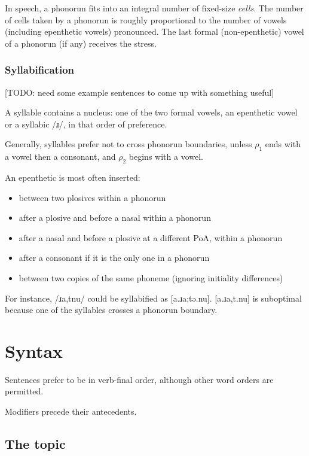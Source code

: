 \documentclass{book}
\begin{document}
In speech, a phonorun fits into an integral number of fixed-size \emph{cells}. The number of cells taken by a phonorun is roughly proportional to the number of vowels (including epenthetic vowels) pronounced. The last formal (non-epenthetic) vowel of a phonorun (if any) receives the stress.

\subsection{Syllabification}

{}[TODO: need some example sentences to come up with something useful]

A syllable contains a nucleus: one of the two formal vowels, an epenthetic vowel or a syllabic /ɹ/, in that order of preference.

Generally, syllables prefer not to cross phonorun boundaries, unless  $\rho_1$ ends with a vowel then a consonant, and $\rho_2$ begins with a vowel.

An epenthetic is most often inserted:

\begin{itemize}
  \item between two plosives within a phonorun
  \item after a plosive and before a nasal within a phonorun
  \item after a nasal and before a plosive at a different PoA, within a phonorun
  \item after a consonant if it is the only one in a phonorun
  \item between two copies of the same phoneme (ignoring initiality differences)
\end{itemize}

For instance,  /ɹa,tnu/ could be syllabified as [a.ɹa;tə.nu]. [a.ɹa,t.nu] is suboptimal because one of the syllables crosses a phonorun boundary.

\chapter{Syntax}

Sentences prefer to be in verb-final order, although other word orders are permitted.

Modifiers precede their antecedents.

\section{The topic}
\end{document}
